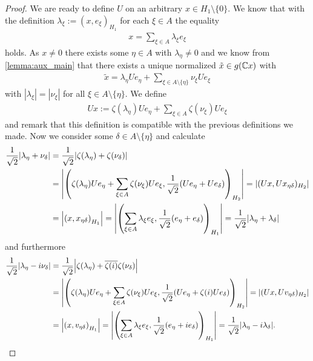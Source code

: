 \begin{proof}
	We are ready to define $U$ on an arbitrary $x \in H_1 \setminus \{0\}$. We know that with the definition $\lambda_\xi := (x,e_\xi)_{H_1}$ for each $\xi \in A$ the equality
	\begin{align*}
		x = \sum_{\xi \in A} \lambda_\xi e_\xi
	\end{align*}
	holds. As $x \neq 0$ there exists some $\eta \in A$ with $\lambda_\eta \neq 0$ and we know from \ref{lemma:aux_main} that there exists a unique normalized $\tilde{x} \in g(\mathbb{C} x)$ with
	\begin{align*}
		\tilde{x} = \lambda_\eta Ue_\eta + \sum_{\xi \in A \setminus \{\eta\}} \nu_\xi Ue_\xi
	\end{align*} 
	with $|\lambda_\xi| = |\nu_\xi|$ for all $\xi \in A \setminus \{\eta\}$. We define
	\begin{align*}
		Ux := \zeta(\lambda_\eta) Ue_\eta + \sum_{\xi \in A} \zeta(\nu_\xi) Ue_\xi
	\end{align*}
	and remark that this definition is compatible with the previous definitions we made. Now we consider some $\delta \in A \setminus \{\eta\}$ and calculate
	\begin{align*}
		\frac{1}{\sqrt{2}}{\left | \lambda_\eta + \nu_\delta \right |} &= \frac{1}{\sqrt{2}} {\left | \zeta(\lambda_\eta) + \zeta(\nu_\delta) \right |} \\
		&= {\left | {\left ( \zeta(\lambda_\eta) Ue_\eta + \sum_{\xi \in A} \zeta(\nu_\xi) Ue_\xi, \frac{1}{\sqrt{2}}(Ue_\eta + Ue_\delta) \right )}_{H_2} \right |} = |(Ux, Ux_{\eta \delta})_{H_2}| \\
		&= {\left | {\left ( x, x_{\eta \delta} \right )}_{H_1} \right |} = {\left | {\left ( \sum_{\xi \in A} \lambda_\xi e_\xi, \frac{1}{\sqrt{2}}(e_\eta + e_\delta) \right )}_{H_1} \right |} = \frac{1}{\sqrt{2}} {\left | \lambda_\eta + \lambda_\delta \right |} 
	\end{align*}
	and furthermore
	\begin{align*}
		\frac{1}{\sqrt{2}}{\left | \lambda_\eta -i \nu_\delta \right |} &= \frac{1}{\sqrt{2}} {\left | \zeta(\lambda_\eta) + \overline{\zeta(i)} \zeta(\nu_\delta) \right |} \\
		&= {\left | {\left ( \zeta(\lambda_\eta) Ue_\eta + \sum_{\xi \in A} \zeta(\nu_\xi) Ue_\xi, \frac{1}{\sqrt{2}}(Ue_\eta + \zeta(i) Ue_\delta) \right )}_{H_2} \right |} = |(Ux, Uv_{\eta \delta})_{H_2}| \\
		&= {\left | {\left ( x, v_{\eta \delta} \right )}_{H_1} \right |} = {\left | {\left ( \sum_{\xi \in A} \lambda_\xi e_\xi, \frac{1}{\sqrt{2}}(e_\eta + ie_\delta) \right )}_{H_1} \right |} = \frac{1}{\sqrt{2}} {\left | \lambda_\eta -i \lambda_\delta \right |}.
	\end{align*}

\end{proof}
